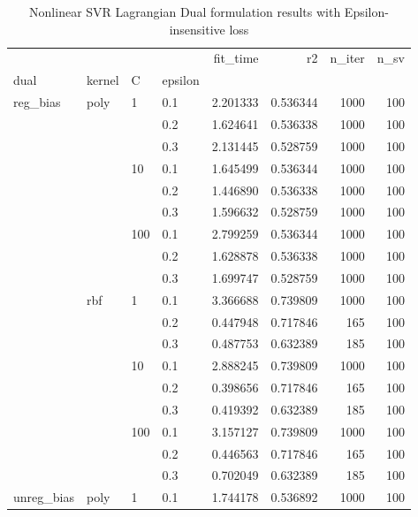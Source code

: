 \begin{table}[H]
\centering
\caption{Nonlinear SVR Lagrangian Dual formulation results with Epsilon-insensitive loss}
\label{nonlinear_lagrangian_dual_l1_svr_cv_results}
\begin{tabular}{llllrrrr}
\toprule
           &     &     &     &  fit\_time &        r2 &  n\_iter &  n\_sv \\
dual & kernel & C & epsilon &           &           &         &       \\
\midrule
reg\_bias & poly & 1   & 0.1 &  2.201333 &  0.536344 &    1000 &   100 \\
           &     &     & 0.2 &  1.624641 &  0.536338 &    1000 &   100 \\
           &     &     & 0.3 &  2.131445 &  0.528759 &    1000 &   100 \\
           &     & 10  & 0.1 &  1.645499 &  0.536344 &    1000 &   100 \\
           &     &     & 0.2 &  1.446890 &  0.536338 &    1000 &   100 \\
           &     &     & 0.3 &  1.596632 &  0.528759 &    1000 &   100 \\
           &     & 100 & 0.1 &  2.799259 &  0.536344 &    1000 &   100 \\
           &     &     & 0.2 &  1.628878 &  0.536338 &    1000 &   100 \\
           &     &     & 0.3 &  1.699747 &  0.528759 &    1000 &   100 \\
           & rbf & 1   & 0.1 &  3.366688 &  0.739809 &    1000 &   100 \\
           &     &     & 0.2 &  0.447948 &  0.717846 &     165 &   100 \\
           &     &     & 0.3 &  0.487753 &  0.632389 &     185 &   100 \\
           &     & 10  & 0.1 &  2.888245 &  0.739809 &    1000 &   100 \\
           &     &     & 0.2 &  0.398656 &  0.717846 &     165 &   100 \\
           &     &     & 0.3 &  0.419392 &  0.632389 &     185 &   100 \\
           &     & 100 & 0.1 &  3.157127 &  0.739809 &    1000 &   100 \\
           &     &     & 0.2 &  0.446563 &  0.717846 &     165 &   100 \\
           &     &     & 0.3 &  0.702049 &  0.632389 &     185 &   100 \\
unreg\_bias & poly & 1   & 0.1 &  1.744178 &  0.536892 &    1000 &   100 \\

\end{tabular}
\end{table}

